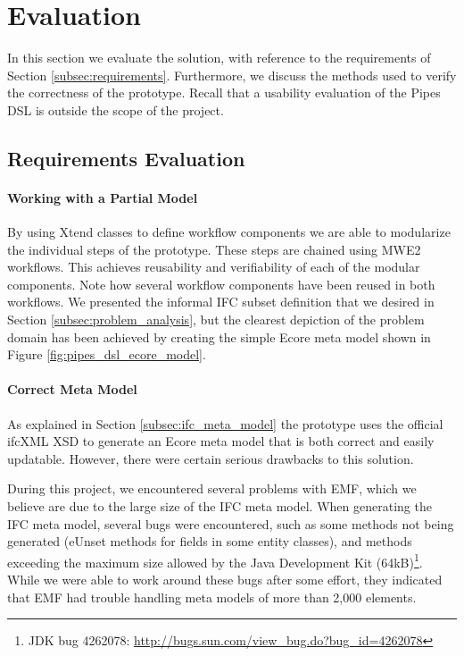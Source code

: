 \section{Evaluation}
\label{sec:evaluation}
In this section we evaluate the solution, with reference to the requirements of Section \ref{subsec:requirements}. Furthermore, we discuss the methods used to verify the correctness of the prototype. Recall that a usability evaluation of the Pipes DSL is outside the scope of the project.


\subsection{Requirements Evaluation}
\label{subsec:requirements_evaluation}
\paragraph{Working with a Partial Model} By using Xtend classes to define workflow components we are able to modularize the individual steps of the prototype. These steps are chained using MWE2 workflows. This achieves reusability and verifiability of each of the modular components. Note how several workflow components have been reused in both workflows. We presented the informal IFC subset definition that we desired in Section \ref{subsec:problem_analysis}, but the clearest depiction of the problem domain has been achieved by creating the simple Ecore meta model shown in Figure \ref{fig:pipes_dsl_ecore_model}.

\paragraph{Correct Meta Model} As explained in Section \ref{subsec:ifc_meta_model} the prototype uses the official ifcXML XSD to generate an Ecore meta model that is both correct and easily updatable. However, there were certain serious drawbacks to this solution.

During this project, we encountered several problems with EMF, which we believe are due to the large size of the IFC meta model. When generating the IFC meta model, several bugs were encountered, such as some methods not being generated (eUnset methods for fields in some entity classes), and methods exceeding the maximum size allowed by the Java Development Kit (64kB)\footnote{JDK bug 4262078: \url{http://bugs.sun.com/view_bug.do?bug_id=4262078}}. While we were able to work around these bugs after some effort, they indicated that EMF had trouble handling meta models of more than 2,000 elements.

